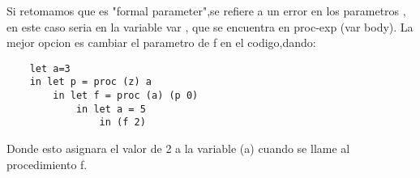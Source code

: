 \documentclass{article}
\begin{document}
Si retomamos que es "formal parameter",se refiere a un error en los parametros , en este caso seria en la variable var , que se encuentra en proc-exp (var body).
La mejor opcion es cambiar el parametro de f en el codigo,dando:
\begin{lstlisting}
    let a=3
    in let p = proc (z) a
        in let f = proc (a) (p 0)
            in let a = 5
                in (f 2)
\end{lstlisting}
Donde esto asignara el valor de 2 a la variable (a) cuando se llame al procedimiento f.
\end{document}
